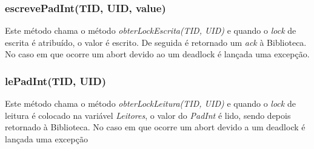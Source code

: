 \subsubsection{escrevePadInt(TID, UID, value)}

Este método chama o método \textit{obterLockEscrita(TID, UID)} e quando o \textit{lock} de escrita é atribuído, o valor é escrito. De seguida é retornado um \textit{ack} à Biblioteca. No caso em que ocorre um abort devido ao um deadlock é lançada uma excepção.

\subsubsection{lePadInt(TID, UID)}

Este método chama o método \textit{obterLockLeitura(TID, UID)} e quando o \textit{lock} de leitura é colocado na variável \textit{Leitores}, o valor do \textit{PadInt} é lido, sendo depois retornado à Biblioteca. No caso em que ocorre um abort devido a um deadlock é lançada uma excepção
